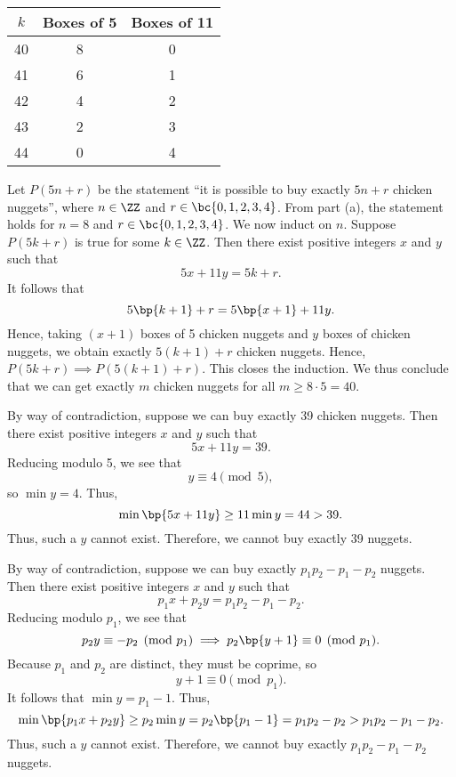 \begin{solution}
    \begin{ppart}
        \begin{table}[H]
            \centering
            \begin{tabular}{|c|c|c|}
            \hline
            $k$ & Boxes of 5 & Boxes of 11 \\ \hline\hline
            40 & 8 & 0 \\ \hline
            41 & 6 & 1 \\ \hline
            42 & 4 & 2 \\ \hline
            43 & 2 & 3 \\ \hline
            44 & 0 & 4 \\ \hline
            \end{tabular}
        \end{table}
    \end{ppart}
    \begin{ppart}
        Let $P(5n + r)$ be the statement ``it is possible to buy exactly $5n+r$ chicken nuggets'', where $n \in \ZZ$ and $r \in \bc{0, 1, 2, 3, 4}$. From part (a), the statement holds for $n = 8$ and $r \in \bc{0, 1, 2, 3, 4}$. We now induct on $n$. Suppose $P(5k+r)$ is true for some $k \in \ZZ$. Then there exist positive integers $x$ and $y$ such that \[5x + 11y = 5k+r.\] It follows that \[5\bp{k+1} + r = 5\bp{x + 1} + 11y.\] Hence, taking $(x+1)$ boxes of 5 chicken nuggets and $y$ boxes of chicken nuggets, we obtain exactly $5(k+1) + r$ chicken nuggets. Hence, $P(5k+r) \implies P(5(k+1) + r)$. This closes the induction. We thus conclude that we can get exactly $m$ chicken nuggets for all $m \geq 8 \cdot 5 = 40$.
    \end{ppart}
    \begin{ppart}
        By way of contradiction, suppose we can buy exactly 39 chicken nuggets. Then there exist positive integers $x$ and $y$ such that \[5x + 11y = 39.\] Reducing modulo 5, we see that \[y \equiv 4 \pmod{5},\] so $\min y = 4$. Thus, \[\min \bp{5x + 11y} \geq 11 \min y = 44 > 39.\] Thus, such a $y$ cannot exist. Therefore, we cannot buy exactly 39 nuggets.
    \end{ppart}
    \begin{ppart}
        By way of contradiction, suppose we can buy exactly $p_1p_2 - p_1 - p_2$ nuggets. Then there exist positive integers $x$ and $y$ such that \[p_1 x + p_2 y = p_1 p_2 - p_1 - p_2.\] Reducing modulo $p_1$, we see that \[p_2 y \equiv -p_2 \pmod{p_1} \implies p_2 \bp{y + 1} \equiv 0 \pmod{p_1}.\] Because $p_1$ and $p_2$ are distinct, they must be coprime, so \[y + 1 \equiv 0 \pmod{p_1}.\] It follows that $\min y = p_1 - 1$. Thus, \[\min \bp{p_1 x + p_2 y} \geq p_2 \min y = p_2 \bp{p_1 - 1} = p_1 p_2 - p_2 > p_1 p_2 - p_1 - p_2.\] Thus, such a $y$ cannot exist. Therefore, we cannot buy exactly $p_1 p_2 - p_1 - p_2$ nuggets.
    \end{ppart}
\end{solution}

